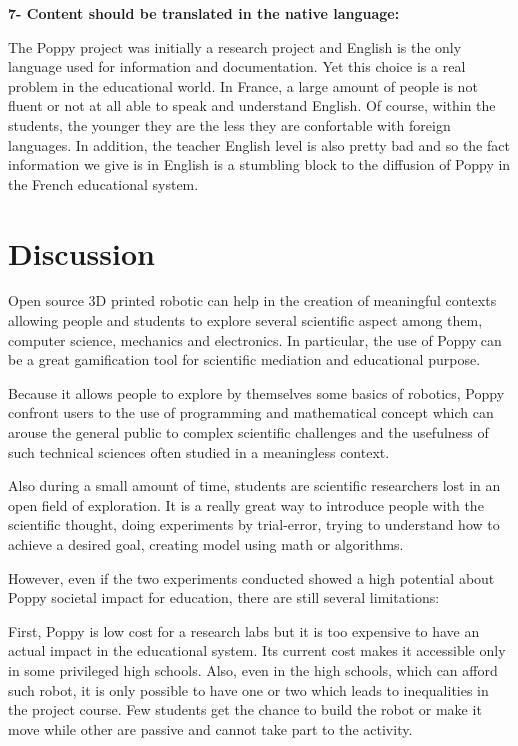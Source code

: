 \textbf{7- Content should be translated in the native language:}

The Poppy project was initially a research project and English is the only language used for information and documentation. Yet this choice is a real problem in the educational world. In France, a large amount of people is not fluent or not at all able to speak and understand English. Of course, within the students, the younger they are the less they are confortable with foreign languages. In addition, the teacher English level is also pretty bad and so the fact information we give is in English is a stumbling block to the diffusion of Poppy in the French educational system.



\section{Discussion} %

Open source 3D printed robotic can help in the creation of meaningful contexts allowing people and students to explore several scientific aspect among them, computer science, mechanics and electronics. In particular, the use of Poppy can be a great gamification tool for scientific mediation and educational purpose.

Because it allows people to explore by themselves some basics of robotics, Poppy confront users to the use of programming and mathematical concept which can arouse the general public to complex scientific challenges and the usefulness of such technical sciences often studied in a meaningless context.

Also during a small amount of time, students are scientific researchers lost in an open field of exploration. It is a really great way to introduce people with the scientific thought, doing experiments by trial-error, trying to understand how to achieve a desired goal, creating model using math or algorithms.

However, even if the two experiments conducted showed a high potential about Poppy societal impact for education, there are still several limitations:

First, Poppy is low cost for a research labs but it is too expensive to have an actual impact in the educational system. Its current cost makes it accessible only in some privileged high schools. Also, even in the high schools, which can afford such robot, it is only possible to have one or two which leads to inequalities in the project course. Few students get the chance to build the robot or make it move while other are passive and cannot take part to the activity.

